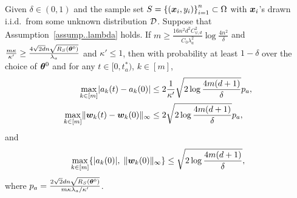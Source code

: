 \documentclass{article}
\begin{document}
\begin{prop}
    Given $\delta\in(0,1)$ and the sample set $S = {\{(\bm{x}_i, y_i)\}}_{i=1}^n\subset\Omega$ with $\bm{x}_i$'s drawn i.i.d.\ from some unknown distribution $\mathcal{D}$. Suppose that Assumption~\ref{assump..lambda} holds. If $m\geq\frac{16n^2d^2C^2_{\psi,d}}{C_0\lambda_a^2}\log\frac{4n^2}{\delta}$ and $\frac{m\kappa}{\kappa'}\geq\frac{4\sqrt{2d}n\sqrt{R_S(\bm{\theta}^0)}}{\lambda_a}$ and $\kappa'\leq 1$, then with probability at least $1-\delta$ over the choice of $\bm{\theta}^0$ and for any $t\in[0,t^*_a)$, $k\in[m]$,
    \begin{align}
        \max\limits_{k\in[m]}\lvert a_k(t) - a_k(0)\rvert
         & \leq 2\frac{1}{\kappa'}\sqrt{2\log\frac{4m(d+1)}{\delta}}p_a, \\
        \max\limits_{k\in[m]}\lVert\bm{w}_k(t) - \bm{w}_k(0)\rVert_{\infty}
         & \leq 2\sqrt{2\log\frac{4m(d+1)}{\delta}}p_a,
    \end{align}
    and
    \begin{equation}
        \max\limits_{k\in[m]}\{\lvert a_k(0)\rvert,\;\lVert\bm{w}_k(0)\rVert_{\infty}\} \leq \sqrt{2\log\frac{4m(d+1)}{\delta}},
    \end{equation}
    where $p_a=\frac{2\sqrt{2}dn\sqrt{R_S(\bm{\theta}^0)}}{m\kappa\lambda_a/\kappa'}$.
\end{prop}
\end{document}
